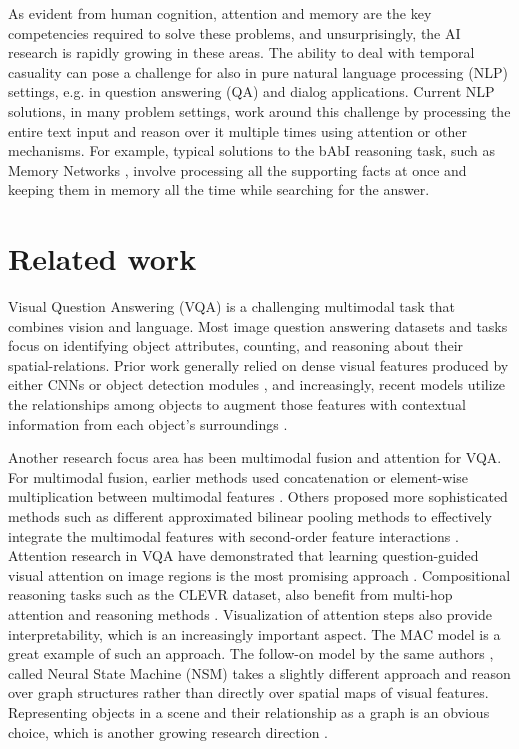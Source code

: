 As evident from human cognition, attention and memory are the key competencies required to solve these problems, and unsurprisingly, the AI research is rapidly growing in these areas.
The ability to deal with temporal casuality can pose a challenge for also in pure natural language processing (NLP) settings, e.g. in question answering (QA) and dialog applications.  
Current NLP solutions, in many problem settings, work around this challenge by processing the entire text input and reason over it multiple times using attention \cite{vaswani2017attention} or other mechanisms.
For example, typical solutions to the bAbI reasoning task, such as Memory Networks \cite{weston2014memory}, involve processing all the supporting facts at once and keeping them in memory all the time while searching for the answer.


\section{Related work}
Visual Question Answering (VQA) is a challenging multimodal task that combines vision and language.  Most image question answering datasets and tasks focus on identifying object attributes, counting, and reasoning about their spatial-relations. Prior work generally relied on dense visual features produced by either CNNs \cite{xiong2016dynamic,yang2016stacked} or object detection modules \cite{desta2018object}, and increasingly, recent models utilize the relationships among objects to augment those features with contextual information from each object’s surroundings \cite{teney2017graph, santoro2017simple}.  

Another research focus area has been multimodal fusion and
attention for VQA. For multimodal fusion, earlier methods used concatenation or element-wise multiplication between multimodal
features \cite{zhou2015simple, antol2015}.  Others proposed more sophisticated methods such as different approximated bilinear pooling methods to effectively integrate the multimodal features with second-order feature interactions \cite{fukui2016multimodal, kim2016hadamard, kim2016hadamard} .  Attention  research in VQA have demonstrated that learning question-guided visual attention on image regions is the most promising approach \cite{yang2016stacked, chen2015abc, ilievski2016focused}.   Compositional reasoning tasks such as the CLEVR dataset, also benefit from multi-hop attention and reasoning methods \cite{hudson2018compositional, song2018explore}.   Visualization of attention steps also provide interpretability, which is an increasingly important aspect. The MAC model \cite{hudson2018compositional} is a great example of such an approach.  The follow-on model by the same authors  \cite{hudson2019learning}, called Neural State Machine (NSM) takes a slightly different approach and reason over graph structures rather than directly over spatial maps of visual features.  Representing objects in a scene and their relationship as a graph is an obvious choice, which is another growing research direction \cite{haurilet2019s, teney2017graph, kim2018dynamic}. 

